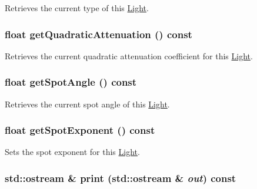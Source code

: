 Retrieves the current type of this \hyperlink{classm3g_1_1Light}{Light}. \hypertarget{classm3g_1_1Light_9ec7130ca1977cfeb4b2cbebc31971b4}{
\subsubsection[{getQuadraticAttenuation}]{\setlength{\rightskip}{0pt plus 5cm}float getQuadraticAttenuation () const}}
\label{classm3g_1_1Light_9ec7130ca1977cfeb4b2cbebc31971b4}


Retrieves the current quadratic attenuation coefficient for this \hyperlink{classm3g_1_1Light}{Light}. \hypertarget{classm3g_1_1Light_1117f914d754fe74c090dc97bde905eb}{
\subsubsection[{getSpotAngle}]{\setlength{\rightskip}{0pt plus 5cm}float getSpotAngle () const}}
\label{classm3g_1_1Light_1117f914d754fe74c090dc97bde905eb}


Retrieves the current spot angle of this \hyperlink{classm3g_1_1Light}{Light}. \hypertarget{classm3g_1_1Light_a359fee191741efb7e576616a59a76f7}{
\subsubsection[{getSpotExponent}]{\setlength{\rightskip}{0pt plus 5cm}float getSpotExponent () const}}
\label{classm3g_1_1Light_a359fee191741efb7e576616a59a76f7}


Sets the spot exponent for this \hyperlink{classm3g_1_1Light}{Light}. \hypertarget{classm3g_1_1Light_6fea17fa1532df3794f8cb39cb4f911f}{
\subsubsection[{print}]{\setlength{\rightskip}{0pt plus 5cm}std::ostream \& print (std::ostream \& {\em out}) const}}
\label{classm3g_1_1Light_6fea17fa1532df3794f8cb39cb4f911f}


